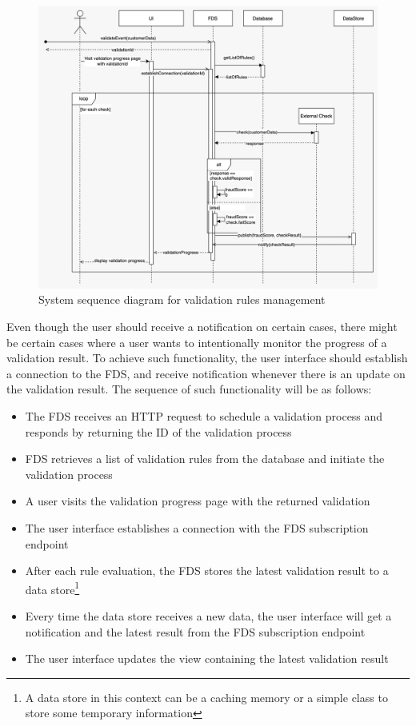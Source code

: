 \begin{figure}[!ht]
 \includegraphics[width=\textwidth]{diagrams/sequence_pubsub.jpeg}
 \caption{System sequence diagram for validation rules management}
\end{figure}

Even though the user should receive a notification on certain cases, there might be certain cases where a user wants to intentionally monitor the progress of a validation result. To achieve such functionality, the user interface should establish a connection to the FDS, and receive notification whenever there is an update on the validation result. The sequence of such functionality will be as follows:

\begin{itemize}
 \item The FDS receives an HTTP request to schedule a validation process and responds by returning the ID of the validation process
 \item FDS retrieves a list of validation rules from the database and initiate the validation process
 \item A user visits the validation progress page with the returned validation 
 \item The user interface establishes a connection with the FDS subscription endpoint
 \item After each rule evaluation, the FDS stores the latest validation result to a data store\footnote{A data store in this context can be a caching memory or a simple class to store some temporary information}
 \item Every time the data store receives a new data, the user interface will get a notification and the latest result from the FDS subscription endpoint
 \item The user interface updates the view containing the latest validation result
\end{itemize}

